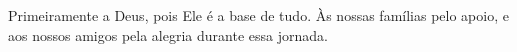 \begin{dedicatoria}
   \vspace*{\fill}
    
    \begin{flushright}
        \begin{minipage}{8cm}
            \begin{SingleSpace}
               Primeiramente a Deus, pois Ele é a base de tudo. Às nossas famílias pelo apoio, e aos nossos amigos pela alegria durante essa jornada.
            \end{SingleSpace}
        \end{minipage}
    \end{flushright}
\end{dedicatoria}
